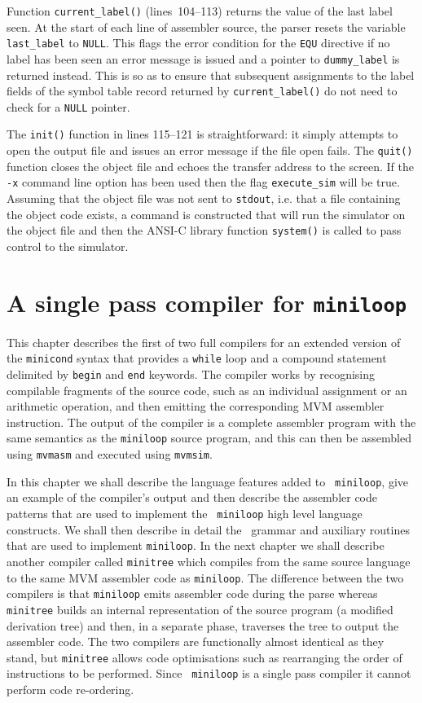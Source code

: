 Function \verb+current_label()+ (lines~104--113) returns the value of the last label seen.
At the start of each line of assembler source, the parser resets the variable \verb+last_label+ to
{\tt NULL}. This flags the error condition for the {\tt EQU} directive\dash
if no label has been seen an error message is issued and a pointer to \verb+dummy_label+
is returned instead. This is so as to ensure that subsequent assignments to the label fields
of the symbol table record returned by \verb+current_label()+ do not need to check for a {\tt NULL}
pointer.

The {\tt init()} function in lines 115--121 is straightforward: it
simply attempts to open the output file and issues an error message if
the file open fails. The {\tt quit()} function closes the object file
and echoes the transfer address to the screen. If the {\tt -x} command
line option has been used then the flag \verb+execute_sim+ will be true.
Assuming that the object file was not sent to {\tt stdout}, i.e. that a
file containing the object code exists, a command is constructed that
will run the simulator on the object file and then the ANSI-C library
function \verb+system()+ is called to pass control to the simulator.


\chapter{A single pass compiler for {\tt miniloop}} \label{miniloop}
This chapter describes the first of two full compilers for an extended
version of  the {\tt minicond} syntax that provides a {\tt while} loop
and a compound statement delimited by {\tt begin} and {\tt end}
keywords. The compiler works by recognising compilable fragments of the
source code, such as an individual assignment or an arithmetic operation,
and then emitting the corresponding MVM  assembler instruction. The output of
the compiler is a complete assembler program with the same semantics as
the {\tt miniloop} source program, and this can then be assembled using
{\tt mvmasm} and executed using {\tt mvmsim}. 

In this chapter we shall describe the language features added to {\tt
miniloop}, give an example of the compiler's output and then describe
the assembler code patterns that are used to implement the {\tt
miniloop} high level language constructs. We shall then describe in
detail the \rdp\ grammar and auxiliary routines that are used to
implement {\tt miniloop}. In the next chapter we shall describe another
compiler called {\tt minitree} which compiles from the same source
language to the same MVM assembler code as {\tt miniloop}. The
difference between  the two compilers is that {\tt miniloop} emits
assembler code during the parse whereas {\tt minitree} builds an
internal representation of the source program (a modified derivation
tree) and then, in a separate phase, traverses the tree to output the
assembler code. The two compilers are functionally almost identical as
they stand, but {\tt minitree} allows code optimisations such as
rearranging the order of instructions to be performed. Since {\tt
miniloop} is a single pass compiler it cannot perform code re-ordering.

